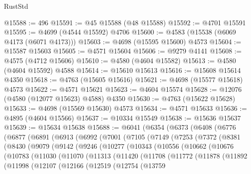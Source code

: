 \begin{lexlean}{RustStd}
\begin{coremodule}
@15588 := 496
@15591 := @45 @15588 (@48 @15588)
@15592 := @4701 @15591
@15595 := @4699 (@4544 @15592) @4706
@15600 := @4583 (@15538 (@6069 @4173 (@6071 @4173)))
@15603 := @4698 (@15595 @15600) @4573
@15604 := @15587 @15603
@15605 := @4571 @15604
@15606 := @9279 @4141
@15608 := @4575 (@4712 @15606)
@15610 := @4580 (@4604 @15582)
@15613 := @4580 (@4604 @15592) @4588
@15614 := @15610 @15613
@15616 := @15608 @15614 @4350
@15618 := @4763 (@15605 @15616)
@15621 := @4698 (@15577 @15618) @4573
@15622 := @4571 @15621
@15623 := @4604 @15574
@15628 := @12076 (@4580 (@12077 @15623) @4588) @4350
@15630 := @4763 (@15622 @15628)
@15633 := @4698 (@15569 @15630) @4573
@15634 := @4571 @15633
@15636 := @4895 (@4604 @15566)
@15637 := @10334 @15549
@15638 := @15636 @15637
@15639 := @15634 @15638
@15688 := @6041
    (@6354
      (@6373
        (@6408
          (@6776
            (@6877
              (@6891
                (@6913
                  (@6992
                    (@7001
                      (@7105
                        (@7149
                          (@7253
                            (@7372
                              (@8381
                                (@8430
                                  (@9079
                                    (@9142
                                      (@9246
                                        (@10277
                                          (@10343
                                            (@10556
                                              (@10662
                                                (@10676
                                                  (@10783
                                                    (@11030
                                                      (@11070
                                                        (@11313
                                                          (@11420
                                                            (@11708
                                                              (@11772
                                                                (@11878
                                                                  (@11892
                                                                    (@11998
                                                                      (@12107
                                                                        (@12166
                                                                          (@12519
                                                                            (@12754
                                                                              (@13759

\end{coremodule}
\end{lexlean}
